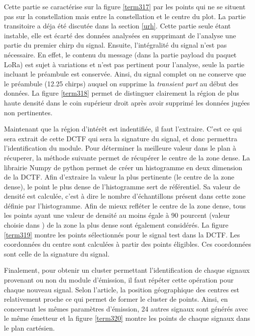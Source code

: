 Cette partie se caractérise sur la figure \ref{term317} par les points qui ne se situent pas sur la constellation mais entre la constellation et le centre du plot. La partie transitoire a déja été discutée dans la section \ref{urh}. Cette partie seule étant instable, elle est écarté des données analysées en supprimant de l'analyse une partie du premier chirp du signal. Ensuite, l'intégralité du signal n'est pas nécessaire. En effet, le contenu du message (dans la partie payload du paquet LoRa) est sujet à variations et n'est pas pertinent pour l'analyse, seule la partie incluant le préambule est conservée. Ainsi, du signal complet on ne conserve que le préambule (12.25 chirps) auquel on supprime la \textit{transient part} au début des données. La figure \ref{term318} permet de distinguer clairement la région de plus haute densité dans le coin supérieur droit après avoir supprimé les données jugées non pertinentes.



Maintenant que la région d'intérêt est indentifiée, il faut l'extraire. C'est ce qui sera extrait de cette DCTF qui sera la signature du signal, et donc permettra l'identification du module. Pour déterminer la meilleure valeur dans le plan à récuperer, la méthode suivante permet de récupérer le centre de la zone dense. La librairie Numpy de python permet de créer un histogramme en deux dimension de la DCTF. Afin d'extraire la valeur la plus pertinente (le centre de la zone dense), le point le plus dense de l'histogramme sert de référentiel. Sa valeur de densité est calculée, c'est à dire le nombre d'échantillons présent dans cette zone définie par l'histogramme. Afin de mieux refléter le centre de la zone dense, tous les points ayant une valeur de densité au moins égale à 90 pourcent (valeur choisie dans \cite{loraDCTF}) de la zone la plus dense sont également considérés. La figure \ref{term319} montre les points sélectionnés pour le signal test dans la DCTF. Les coordonnées du centre sont calculées à partir des points éligibles. Ces coordonnées sont celle de la signature du signal. 

\vspace{0.1cm}

Finalement, pour obtenir un cluster permettant l'identification de chaque signaux provenant ou non du module d'émission, il faut répéter cette opération pour chaque nouveau signal. Selon l'article, la position géographique des centres est relativement proche ce qui permet de former le cluster de points. Ainsi, en concervant les mêmes paramètres d'émission, 24 autres signaux sont générés avec le même émetteur et la figure \ref{term320} montre les points de chaque signaux dans le plan cartésien.

